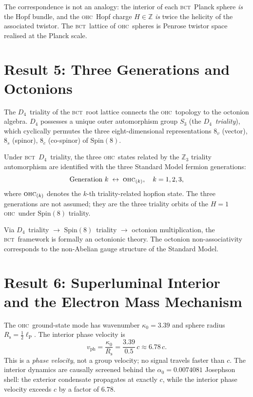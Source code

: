 \documentclass[aps,prl,preprint,superscriptaddress,floatfix]{revtex4-2}
\newcommand{\az}{\alpha_0}
\newcommand{\lP}{\ell_{\mathrm{P}}}
\newcommand{\BCT}{\textsc{bct}}
\newcommand{\OHC}{\textsc{ohc}}
\newcommand{\Rsph}{R_{\mathrm{s}}}
\newcommand{\kz}{\kappa_0}
\newcommand{\HopfN}{H}
\newcommand{\vph}{v_{\mathrm{ph}}}
\begin{document}
\medskip

\noindent
The correspondence is not an analogy: the interior of each \BCT\ Planck
sphere \emph{is} the Hopf bundle, and the \OHC\ Hopf charge
$\HopfN\in\mathbb{Z}$ \emph{is} twice the helicity of the associated
twistor.
The \BCT\ lattice of \OHC\ spheres is Penrose twistor space realised at
the Planck scale.

\section{Result 5: Three Generations and Octonions}
\label{sec:octonions}

The $D_4$~triality of the \BCT\ root lattice connects the \OHC\ topology
to the octonion algebra.
$D_4$ possesses a unique outer automorphism group $S_3$ (the
\emph{$D_4$~triality}), which cyclically permutes the three
eight-dimensional representations
$8_v$ (vector), $8_s$ (spinor), $8_c$ (co-spinor) of $\mathrm{Spin}(8)$.

Under \BCT\ $D_4$~triality, the three \OHC\ states related by the
$\mathbb{Z}_3$ triality automorphism are identified with the three
Standard Model fermion generations:
\begin{equation}
  \text{Generation } k \;\leftrightarrow\; \OHC_{(k)},
  \quad k = 1,2,3,
  \label{eq:generations}
\end{equation}
where $\OHC_{(k)}$ denotes the $k$-th triality-related hopfion state.
The three generations are not assumed; they are the three triality
orbits of the $\HopfN=1$ \OHC\ under $\mathrm{Spin}(8)$ triality.

Via $D_4$~triality $\to$ $\mathrm{Spin}(8)$~triality $\to$ octonion
multiplication, the \BCT\ framework is formally an octonionic theory.
The octonion non-associativity corresponds to the non-Abelian gauge
structure of the Standard Model.

\section{Result 6: Superluminal Interior and the Electron Mass Mechanism}
\label{sec:superluminal}

The \OHC\ ground-state mode has wavenumber $\kz = 3.39$ and sphere
radius $\Rsph = \tfrac{1}{2}\lP$.
The interior phase velocity is
\begin{equation}
  \vph = \frac{\kz}{\Rsph}
  = \frac{3.39}{0.5}\,c
  \approx 6.78\,c.
  \label{eq:phase-velocity}
\end{equation}
This is a \emph{phase velocity}, not a group velocity; no signal travels
faster than $c$.
The interior dynamics are causally screened behind the
$\az = 0.0074081$ Josephson shell: the exterior condensate propagates at
exactly $c$, while the interior phase velocity exceeds $c$ by a factor
of $6.78$.
\end{document}
